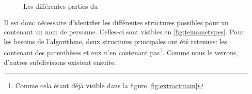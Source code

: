 \begin{figure}[h!]
	\centering
	\caption{Les différentes parties du \tname}
	\label{code:prepin_teiname_part}
\end{figure}

Il est donc nécessaire d'identifier les différentes structures possibles pour un \tname{} contenant un nom de personne. Celles-ci sont visibles en \ref{fig:teinametypes}. Pour les besoins de l'algorithme, deux structures principales ont été retenues: les \tname{} contenant des parenthèses et eux n'en contenant pas\footnote{Comme cela étant déjà visible dans la figure \ref{fig:extractmain}}. Comme nous le verrons, d'autres subdivisions existent ensuite.


